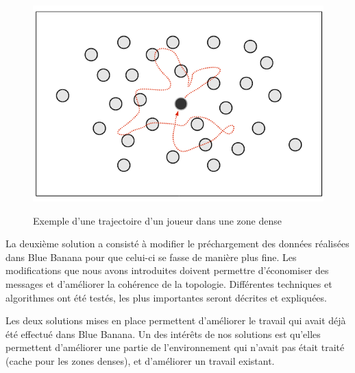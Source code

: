         \begin{figure}[!h]
        \centering
        \includegraphics[scale=0.25]{./Ressources/Images/mouvementsZoneDense.png}\\
        \caption{Exemple d'une trajectoire d'un joueur dans une zone dense}
        \label{mouveDense}
        \end{figure}
\par La deuxième solution a consisté à modifier le préchargement des données réalisées dans Blue Banana pour que celui-ci se fasse de manière plus fine. Les modifications que nous avons introduites doivent permettre d'économiser des messages et d'améliorer la cohérence de la topologie. Différentes techniques et algorithmes ont été testés, les plus importantes seront décrites et expliquées.
\par Les deux solutions mises en place permettent d'améliorer le travail qui avait déjà été effectué dans Blue Banana. Un des intérêts de nos solutions est qu'elles permettent d'améliorer une partie de l'environnement qui n'avait pas était traité (cache pour les zones denses), et d'améliorer un travail existant.


